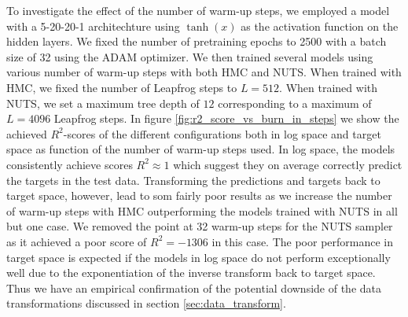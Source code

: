 To investigate the effect of the number of warm-up steps, we employed a model with a 5-20-20-1 architechture using $\tanh(x)$ as the activation function on the hidden layers. We fixed the number of pretraining epochs to 2500 with a batch size of 32 using the ADAM optimizer.
We then trained several models using various number of warm-up steps with both HMC and NUTS. When trained with HMC, we fixed the number of Leapfrog steps to $L = 512$. When trained with NUTS, we set a maximum tree depth of $12$ corresponding to a maximum of $L = 4096$ Leapfrog steps.
In figure \ref{fig:r2_score_vs_burn_in_steps} we show the achieved $R^2$-scores of the different configurations both in log space and target space as function of the number of warm-up steps used. In log space, the models consistently achieve scores $R^2 \approx 1$ which suggest they on average correctly predict the targets in the test data. Transforming the predictions and targets back to target space, however, lead to som fairly poor results as we increase the number of warm-up steps with HMC outperforming the models trained with NUTS in all but one case. We removed the point at 32 warm-up steps for the NUTS sampler as it achieved a poor score of $R^2 = -1306$ in this case. 
The poor performance in target space is expected if the models in log space do not perform exceptionally well due to the exponentiation of the inverse transform back to target space. Thus we have an empirical confirmation of the potential downside of the data transformations discussed in section \ref{sec:data_transform}.

